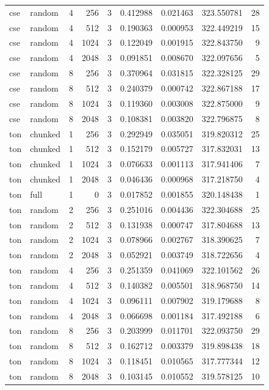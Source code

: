 \begin{tabular}{llrrrrrrr}
cse & random & 4 & 256 & 3 & 0.412988 & 0.021463 & 323.550781 & 28 \\
cse & random & 4 & 512 & 3 & 0.190363 & 0.000953 & 322.449219 & 15 \\
cse & random & 4 & 1024 & 3 & 0.122049 & 0.001915 & 322.843750 & 9 \\
cse & random & 4 & 2048 & 3 & 0.091851 & 0.008670 & 322.097656 & 5 \\
cse & random & 8 & 256 & 3 & 0.370964 & 0.031815 & 322.328125 & 29 \\
cse & random & 8 & 512 & 3 & 0.240379 & 0.000742 & 322.867188 & 17 \\
cse & random & 8 & 1024 & 3 & 0.119360 & 0.003008 & 322.875000 & 9 \\
cse & random & 8 & 2048 & 3 & 0.108381 & 0.003820 & 322.796875 & 8 \\
ton & chunked & 1 & 256 & 3 & 0.292949 & 0.035051 & 319.820312 & 25 \\
ton & chunked & 1 & 512 & 3 & 0.152179 & 0.005727 & 317.832031 & 13 \\
ton & chunked & 1 & 1024 & 3 & 0.076633 & 0.001113 & 317.941406 & 7 \\
ton & chunked & 1 & 2048 & 3 & 0.046436 & 0.000968 & 317.218750 & 4 \\
ton & full & 1 & 0 & 3 & 0.017852 & 0.001855 & 320.148438 & 1 \\
ton & random & 2 & 256 & 3 & 0.251016 & 0.004436 & 322.304688 & 25 \\
ton & random & 2 & 512 & 3 & 0.131938 & 0.000747 & 317.804688 & 13 \\
ton & random & 2 & 1024 & 3 & 0.078966 & 0.002767 & 318.390625 & 7 \\
ton & random & 2 & 2048 & 3 & 0.052921 & 0.003749 & 318.722656 & 4 \\
ton & random & 4 & 256 & 3 & 0.251359 & 0.041069 & 322.101562 & 26 \\
ton & random & 4 & 512 & 3 & 0.140382 & 0.005501 & 318.968750 & 14 \\
ton & random & 4 & 1024 & 3 & 0.096111 & 0.007902 & 319.179688 & 8 \\
ton & random & 4 & 2048 & 3 & 0.066698 & 0.001184 & 317.492188 & 6 \\
ton & random & 8 & 256 & 3 & 0.203999 & 0.011701 & 322.093750 & 29 \\
ton & random & 8 & 512 & 3 & 0.162712 & 0.003379 & 319.898438 & 18 \\
ton & random & 8 & 1024 & 3 & 0.118451 & 0.010565 & 317.777344 & 12 \\
ton & random & 8 & 2048 & 3 & 0.103145 & 0.010552 & 319.578125 & 10 \\
\bottomrule
\end{tabular}
